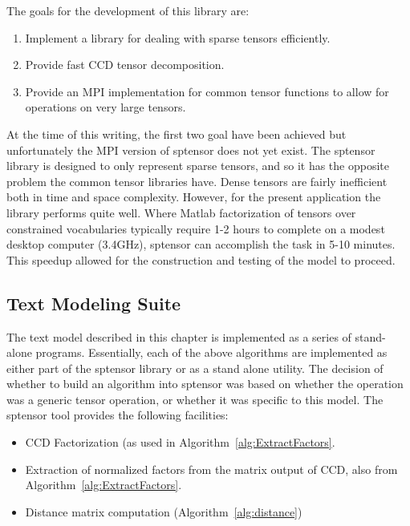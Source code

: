 \documentclass[../ut-dissertation.tex]{subfiles}
\begin{document}
The goals for the development of this library are:
\begin{enumerate}
  \item Implement a library for dealing with sparse tensors
    efficiently.
  \item Provide fast CCD tensor decomposition.
  \item Provide an MPI implementation for common tensor functions to
    allow for operations on very large tensors.
\end{enumerate}
At the time of this writing, the first two goal have been achieved but
unfortunately the MPI version of sptensor does not yet exist.  The
sptensor library is designed to only represent sparse tensors, and so
it has the opposite problem the common tensor libraries have.  Dense
tensors are fairly inefficient both in time and space complexity.
However, for the present application the library performs quite well.
Where Matlab factorization of tensors over constrained vocabularies
typically require 1-2 hours to complete on a modest desktop computer
(3.4GHz), sptensor can accomplish the task in 5-10 minutes.  This
speedup allowed for the construction and testing of the model to
proceed.

\subsection{Text Modeling Suite}
The text model described in this chapter is implemented as a series of
stand-alone programs.  Essentially, each of the above algorithms are
implemented as either part of the sptensor library or as a stand alone
utility.  The decision of whether to build an algorithm into sptensor
was based on whether the operation was a generic tensor operation, or
whether it was specific to this model.  The sptensor tool provides the
following facilities:
\begin{itemize}
\item CCD Factorization (as used in
  Algorithm~\ref{alg:ExtractFactors}.
\item Extraction of normalized factors from the matrix output of CCD,
  also from Algorithm~\ref{alg:ExtractFactors}.
\item Distance matrix computation (Algorithm~\ref{alg:distance})
\end{itemize}
\end{document}
